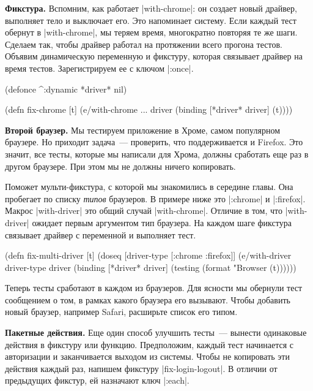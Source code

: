 \textbf{Фикстура.} Вспомним, как работает \spverb|with-chrome|: он создает новый
драйвер, выполняет тело и выключает его. Это напоминает систему. Если каждый
тест обернут в \spverb|with-chrome|, мы теряем время, многократно повторяя те же
шаги. Сделаем так, чтобы драйвер работал на протяжении всего прогона
тестов. Объявим динамическую переменную и фикстуру, которая связывает драйвер на
время тестов. Зарегистрируем ее с ключом \spverb|:once|.

\begin{english}
  \begin{clojure}
(defonce ^:dynamic *driver* nil)

(defn fix-chrome [t]
  (e/with-chrome {...} driver
    (binding [*driver* driver]
      (t))))
  \end{clojure}
\end{english}

\textbf{Второй браузер.} Мы тестируем приложение в Хроме, самом популярном
браузере. Но приходит задача~--- проверить, что поддерживается и Firefox. Это
значит, все тесты, которые мы написали для Хрома, должны сработать еще раз в
другом браузере. При этом мы не должны ничего копировать.

Поможет мульти-фикстура, с которой мы знакомились в середине главы. Она
пробегает по списку \emph{типов} браузеров. В примере ниже это \spverb|:chrome|
и \spverb|:firefox|. Макрос \spverb|with-driver| это общий случай
\spverb|with-chrome|. Отличие в том, что \spverb|with-driver| ожидает первым
аргументом тип браузера. На каждом шаге фикстура связывает драйвер с переменной
и выполняет тест.

\begin{english}
  \begin{clojure}
(defn fix-multi-driver [t]
  (doseq [driver-type [:chrome :firefox]]
    (e/with-driver driver-type {} driver
      (binding [*driver* driver]
        (testing (format "Browser %
          (t))))))
  \end{clojure}
\end{english}

Теперь тесты сработают в каждом из браузеров. Для ясности мы обернули тест
сообщением о том, в рамках какого браузера его вызывают. Чтобы добавить новый
браузер, например Safari, расширьте список его типом.

\textbf{Пакетные действия.} Еще один способ улучшить тесты~--- вынести
одинаковые действия в фикстуру или функцию. Предположим, каждый тест начинается
с авторизации и заканчивается выходом из системы. Чтобы не копировать эти
действия каждый раз, напишем фикстуру \spverb|fix-login-logout|. В отличии от
предыдущих фикстур, ей назначают ключ \spverb|:each|.

